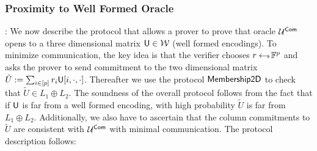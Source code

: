 \subsubsection{Proximity to Well Formed Oracle}: We now describe the protocol
that allows a prover to prove that oracle $\mathcal{U}^{\mathsf{Com}}$ opens to a three
dimensional matrix $\mathsf{U}\in \mathcal{W}$ (well formed encodings). To minimize communication, the key idea is that the verifier chooses
$r\hskip2.3pt{\gets\!\!\mbox{\tiny${\$}$\normalsize}}\, \mathbb{F}^p$ and asks the prover to send commitment to the two dimensional
matrix $\tilde{U}:=\sum_{i\in [p]}r_i\mathsf{U}[i,\cdot,\cdot]$. Thereafter we use the protocol
$\mathsf{Membership2D}$ to check that $\tilde{U}\in L_1\oplus L_2$. The soundness of the overall
protocol follows from the fact that if $\mathsf{U}$ is far from a well formed
encoding, with high probability $\tilde{U}$ is far from $L_1\oplus L_2$.
Additionally, we also have to ascertain that the column commitments to
$\tilde{U}$ are consistent with $\mathcal{U}^{\mathsf{Com}}$ with minimal communication. The
protocol description follows:
